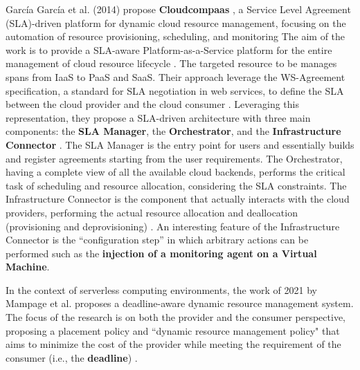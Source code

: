 García García et al. (2014) propose \textbf{Cloudcompaas} \cite{GARCIAGARCIA20141}, a Service Level Agreement (SLA)-driven platform for dynamic cloud resource management, focusing on the automation of resource provisioning, scheduling, and monitoring
The aim of the work is to provide a SLA-aware Platform-as-a-Service platform for the entire management of cloud resource lifecycle \cite{GARCIAGARCIA20141}.
The targeted resource to be manages spans from IaaS to PaaS and SaaS.
Their approach leverage the WS-Agreement specification, a standard for SLA negotiation in web services, to define the SLA between the cloud provider and the cloud consumer \cite{GARCIAGARCIA20141}.
Leveraging this representation, they propose a SLA-driven architecture with three main components: the \textbf{SLA Manager}, the \textbf{Orchestrator}, and the \textbf{Infrastructure Connector} \cite{GARCIAGARCIA20141}.
The SLA Manager is the entry point for users and essentially builds and register agreements starting from the user requirements.
The Orchestrator, having a complete view of all the available cloud backends, performs the critical task of scheduling and resource allocation, considering the SLA constraints.
The Infrastructure Connector is the component that actually interacts with the cloud providers, performing the actual resource allocation and deallocation (provisioning and deprovisioning) \cite{GARCIAGARCIA20141}.
An interesting feature of the Infrastructure Connector is the ``configuration step'' in which arbitrary actions can be performed such as the \textbf{injection of a monitoring agent on a Virtual Machine}.
\newline

In the context of serverless computing environments, the work of 2021 by Mampage et al. \cite{9499407} proposes a deadline-aware dynamic resource management system.
The focus of the research is on both the provider and the consumer perspective, proposing a placement policy and ``dynamic resource management policy" that aims to minimize the cost of the provider while meeting the requirement of the consumer (i.e., the \textbf{deadline}) \cite{9499407}.
\newline





